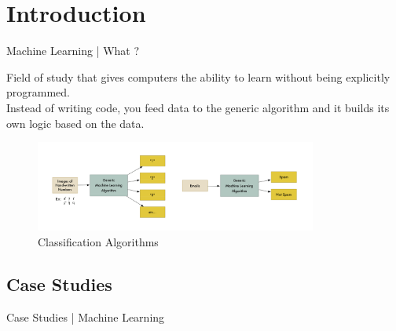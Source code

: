 \documentclass[10pt]{beamer}
\begin{document}
\begingroup
	
	\section{Introduction}
		\begin{frame}{Machine Learning | What ?}
			\begin{center}
				\large{Field of study that gives computers the ability to learn without being explicitly programmed.}\\
				\bigskip
				\small{Instead of writing code, you feed data to the generic algorithm and it builds its own logic based on the data.}
				\begin{figure}
				\centering
				\includegraphics[width=\linewidth,height=30mm]{images/classif-ex}
				\caption[This machine learning algorithm is a black box that can be re-used for lots of different classification problems.]{Classification Algorithms}
				\end{figure}
			\end{center}
		\end{frame}
		\subsection{Case Studies}
			\begin{frame}{Case Studies | Machine Learning}
			\end{frame}
\end{document}

